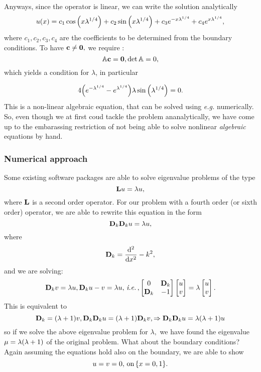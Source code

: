 \documentclass[../main.tex]{subfiles}
\begin{document}
Anyways, since the operator is linear, we can write the solution analytically
\[
	u(x) = c_1 \cos\qty(x \lambda^{1/4}) + c_2 \sin\qty(x \lambda^{1/4}) + c_3 e^{-x \lambda^{1/4}} + c_4 e^{x \lambda^{1/4}},
\]
where $c_1, c_2, c_3, c_4$ are the coefficients to be determined from the boundary conditions. To have $\vb{c} \neq \vb{0},$ we require :
\[
	\mathbb{A} \vb{c} = \vb{0}, \det \mathbb{A} = 0,
\]
which yields a condition for $\lambda$, in particular

\[
	4\qty(e^{-\lambda^{1/4}}-e^{\lambda^{1/4}})\lambda \sin\qty(\lambda^{1/4}) = 0.
\]
This is a non-linear algebraic equation, that can be solved using \textit{e.g.} numerically. So, even though we at first coud tackle the problem ananalytically, we have come up to the embarassing restriction of not being able to solve nonlinear \textit{algebraic} equations by hand.

\subsubsection{Numerical approach}
\label{sec:numerical_approach}

Some existing software packages are able to solve eigenvalue problems of the type
\[
	\vb{L}u = \lambda u,
\]
where $\vb{L}$ is a second order operator. For our problem with a fourth order (or sixth order) operator, we are able to rewrite this equation in the form
\[
	\vb{D}_k \vb{D}_k u = \lambda u,
\]
where
\[
	\vb{D}_k = \dv[2]{x}-k^{2},
\]
and we are solving:
\[
	\vb{D}_k v = \lambda u, \vb{D}_k u - v = \lambda u, \, \text{\textit{i.e.}} \,, \begin{bmatrix}
		0 & \vb{D}_k \\
		\vb{D}_k & -1
	\end{bmatrix} \begin{bmatrix}
		u \\
		v
	\end{bmatrix}
	= \lambda \begin{bmatrix}
		u \\
		v
	\end{bmatrix}.
\]
This is equivalent to
\[
	\vb{D}_k = \qty(\lambda+1)v, \vb{D}_k \vb{D}_k u = \qty(\lambda+1)\vb{D}_k v, \Rightarrow \vb{D}_k \vb{D}_k u = \lambda \qty(\lambda +1) u
\]
so if we solve the above eigenvalue problem for $\lambda,$ we have found the eigenvalue $\mu = \lambda \qty(\lambda +1)$ of the original problem. What about the boundary conditions? Again assuming the equations hold also on the boundary, we are able to show
\[
	u = v = 0, \, \text{on} \, \qty{x = 0,1}.
\]
\end{document}
